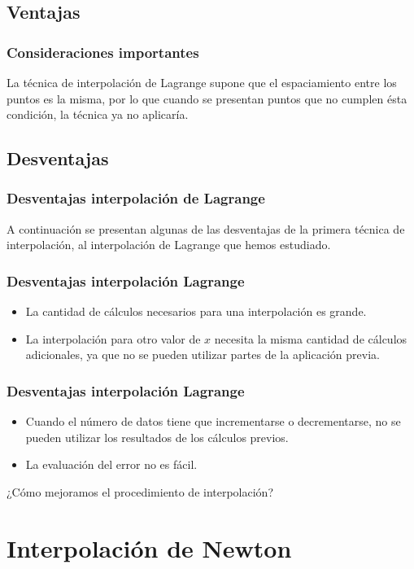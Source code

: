 \documentclass[12pt]{beamer}
\begin{document}
\subsection{Ventajas}

\begin{frame}
\frametitle{Consideraciones importantes}
La técnica de interpolación de Lagrange supone que el espaciamiento entre los puntos es la misma, por lo que cuando se presentan puntos que no cumplen ésta condición, la técnica ya no aplicaría.
\end{frame}

\subsection{Desventajas}

\begin{frame}
\frametitle{Desventajas interpolación de Lagrange}
A continuación se presentan algunas de las desventajas de la primera técnica de interpolación, al interpolación de Lagrange que hemos estudiado.
\end{frame}
\begin{frame}
\frametitle{Desventajas interpolación Lagrange}
\begin{itemize}[<+->]
\item[\ding{212}] La cantidad de cálculos necesarios para una interpolación es grande.
\item[\ding{212}] La interpolación para otro valor de $x$ necesita la misma cantidad de cálculos adicionales, ya que no se pueden utilizar partes de la aplicación previa.
\end{itemize}
\end{frame}
\begin{frame}
\frametitle{Desventajas interpolación Lagrange}
\begin{itemize}[<+->]
\item[\ding{212}] Cuando el número de datos tiene que incrementarse o decrementarse, no se pueden utilizar los resultados de los cálculos previos.
\item[\ding{212}] La evaluación del error no es fácil.
\end{itemize}
\pause
¿Cómo mejoramos el procedimiento de interpolación?
\end{frame}

\section{Interpolación de Newton}
\end{document}
